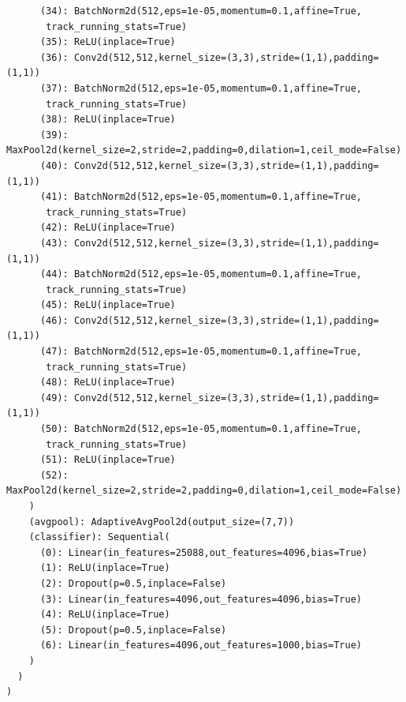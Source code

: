 \documentclass{article}
\begin{document}
\begin{verbatim}
      (34): BatchNorm2d(512,eps=1e-05,momentum=0.1,affine=True,
       track_running_stats=True)
      (35): ReLU(inplace=True)
      (36): Conv2d(512,512,kernel_size=(3,3),stride=(1,1),padding=(1,1))
      (37): BatchNorm2d(512,eps=1e-05,momentum=0.1,affine=True,
       track_running_stats=True)
      (38): ReLU(inplace=True)
      (39): MaxPool2d(kernel_size=2,stride=2,padding=0,dilation=1,ceil_mode=False)
      (40): Conv2d(512,512,kernel_size=(3,3),stride=(1,1),padding=(1,1))
      (41): BatchNorm2d(512,eps=1e-05,momentum=0.1,affine=True,
       track_running_stats=True)
      (42): ReLU(inplace=True)
      (43): Conv2d(512,512,kernel_size=(3,3),stride=(1,1),padding=(1,1))
      (44): BatchNorm2d(512,eps=1e-05,momentum=0.1,affine=True,
       track_running_stats=True)
      (45): ReLU(inplace=True)
      (46): Conv2d(512,512,kernel_size=(3,3),stride=(1,1),padding=(1,1))
      (47): BatchNorm2d(512,eps=1e-05,momentum=0.1,affine=True,
       track_running_stats=True)
      (48): ReLU(inplace=True)
      (49): Conv2d(512,512,kernel_size=(3,3),stride=(1,1),padding=(1,1))
      (50): BatchNorm2d(512,eps=1e-05,momentum=0.1,affine=True,
       track_running_stats=True)
      (51): ReLU(inplace=True)
      (52): MaxPool2d(kernel_size=2,stride=2,padding=0,dilation=1,ceil_mode=False)
    )
    (avgpool): AdaptiveAvgPool2d(output_size=(7,7))
    (classifier): Sequential(
      (0): Linear(in_features=25088,out_features=4096,bias=True)
      (1): ReLU(inplace=True)
      (2): Dropout(p=0.5,inplace=False)
      (3): Linear(in_features=4096,out_features=4096,bias=True)
      (4): ReLU(inplace=True)
      (5): Dropout(p=0.5,inplace=False)
      (6): Linear(in_features=4096,out_features=1000,bias=True)
    )
  )
)
\end{verbatim}
\end{document}
